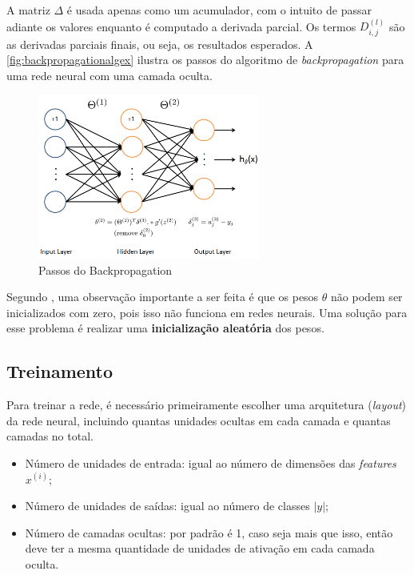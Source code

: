 A matriz $\Delta$ é usada apenas como um acumulador, com o intuito de passar adiante os valores enquanto é computado a derivada parcial. Os termos $D_{i,j}^{(l)}$ são as derivadas parciais finais, ou seja, os resultados esperados. A \autoref{fig:backpropagationalgex} ilustra os passos do algoritmo de \textit{backpropagation} para uma rede neural com uma camada oculta.

\begin{figure}
\centering
\caption{Passos do Backpropagation} \label{fig:backpropagationalgex}
\includegraphics[width=0.65\textwidth]{img/backpropagationalg}
\end{figure}

Segundo \cite{machinelearningcoursera}, uma observação importante a ser feita é que os pesos $\theta$ não podem ser inicializados com zero, pois isso não funciona em redes neurais. Uma solução para esse problema é realizar uma \textbf{inicialização aleatória} dos pesos.

\subsection{Treinamento}

Para treinar a rede, é necessário primeiramente escolher uma arquitetura (\textit{layout}) da rede neural, incluindo quantas unidades ocultas em cada camada e quantas camadas no total.

\begin{itemize}
	\item Número de unidades de entrada: igual ao número de dimensões das \textit{features} $x^{(i)}$;
	\item Número de unidades de saídas: igual ao número de classes $|y|$;
	\item Número de camadas ocultas: por padrão é 1, caso seja mais que isso, então deve ter a mesma quantidade de unidades de ativação em cada camada oculta.
\end{itemize}

